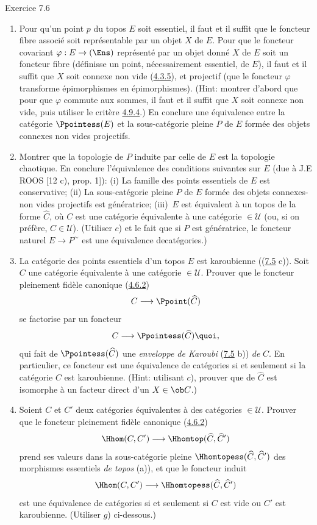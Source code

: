 \documentclass[10pt]{../fichiers-configuration-latex/smfart}
\begin{document}
\begin{enonce*}[remark]{Exercice 7.6}
\begin{enumerate}
\item Pour qu'un point $p$ du topos $E$ soit essentiel, il faut et il
suffit que le foncteur fibre associé soit représentable par un objet
$X$ de $E$. Pour que le foncteur covariant $\varphi:E\rightarrow
(\Ens)$ représenté par un objet donné $X$ de $E$ soit un foncteur
fibre (\ie définisse un point, nécessairement essentiel, de $E$), il
faut et il suffit que $X$ soit connexe non vide
(\hyperref[IV.subsubsec4.3.5]{4.3.5}), et projectif (\ie que le foncteur
$\varphi$ transforme épimorphismes en épimorphismes). (Hint: montrer
d'abord que pour que $\varphi$ commute aux sommes, il faut et il
suffit que $X$ soit connexe non vide, puis utiliser le critère
\hyperref[IV.prop4.9.4]{4.9.4}.) En conclure une équivalence entre la catégorie
$\Ppointess(E)$ et la sous-catégorie pleine $P$ de $E$ formée des
objets connexes non vides projectifs.

\item Montrer que la topologie de $P$ induite par celle de $E$ est la
topologie chaotique. En conclure l'équivalence des conditions
suivantes sur $E$ (due à J.E ROOS [12 c), prop. 1]): (i) La famille
des points essentiels de $E$ est conservative; (ii) La
sous-catégorie pleine $P$ de $E$ formée des objets connexes-non
vides projectifs est génératrice; (iii)~$E$ est équivalent à un
topos de la forme $\widehat{C}$, où $C$ est une catégorie
équivalente à une catégorie $\in 𝒰$ (ou, si on préfère,
$C\in 𝒰$). (Utiliser $c$) et le fait que si $P$ est
génératrice, le foncteur naturel $E\rightarrow P^{\sim}$ est une
équivalence de\pageoriginale catégories.)

\item La catégorie des points essentiels d'un topos $E$ est
karoubienne (\cf (\hyperref[IV.exer7.5]{7.5} c)). Soit $C$ une catégorie
équivalente à une catégorie $\in 𝒰$. Prouver que le foncteur
pleinement fidèle canonique (\hyperref[IV.subsubsec4.6.2]{4.6.2})
$$
C\longrightarrow \Ppoint(\widehat{C})
$$
se factorise par un foncteur
$$
C\longrightarrow \Ppointess(\widehat{C}){\quoi},
$$
qui fait de $\Ppointess(\widehat{C})$ une \emph{enveloppe de
Karoubi} (\hyperref[IV.exer7.5]{7.5} b)) \emph{de} $C$. En particulier, ce
foncteur est une équivalence de catégories si et seulement si la
catégorie $C$ est karoubienne. (Hint: utilisant $c$), prouver que
 de $\widehat{C}$ est isomorphe à un facteur direct
d'un $X\in \ob C$.)

\item Soient $C$ et $C'$ deux catégories équivalentes à des catégories
$\in 𝒰$. Prouver que le foncteur pleinement fidèle canonique
(\hyperref[IV.subsubsec4.6.2]{4.6.2})
$$
\Hhom(C,C')\longrightarrow \Hhomtop(\widehat{C},\widehat{C}')
$$
prend ses valeurs dans la sous-catégorie pleine
$\Hhomtopess(\widehat{C},\widehat{C}')$ des morphismes essentiels
\emph{de topos} (a)), et que le foncteur induit
$$
\Hhom(C,C')\longrightarrow \Hhomtopess(\widehat{C},\widehat{C}')
$$
est une équivalence de catégories si et seulement si $C$ est vide ou
$C'$ est karoubienne. (Utiliser $g$) ci-dessous.)


\end{enumerate}
\end{enonce*}
\end{document}
